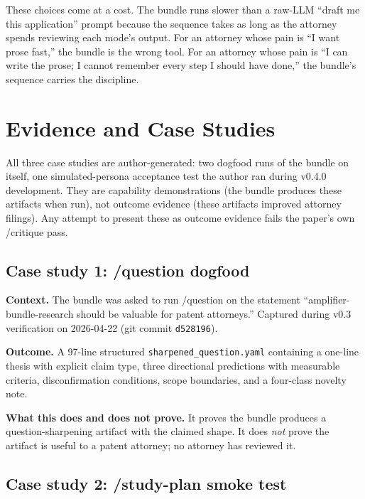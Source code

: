 \documentclass[11pt,letterpaper]{article}
\begin{document}
These choices come at a cost. The bundle runs slower than a raw-LLM
``draft me this application'' prompt because the sequence takes as
long as the attorney spends reviewing each mode's output. For an
attorney whose pain is ``I want prose fast,'' the bundle is the
wrong tool. For an attorney whose pain is ``I can write the prose; I
cannot remember every step I should have done,'' the bundle's
sequence carries the discipline.

\section{Evidence and Case Studies}

All three case studies are author-generated: two dogfood runs of the
bundle on itself, one simulated-persona acceptance test the author
ran during v0.4.0 development. They are capability demonstrations
(the bundle produces these artifacts when run), not outcome evidence
(these artifacts improved attorney filings). Any attempt to present
these as outcome evidence fails the paper's own /critique pass.

\subsection{Case study 1: /question dogfood}

\textbf{Context.} The bundle was asked to run /question on the
statement ``amplifier-bundle-research should be valuable for patent
attorneys.'' Captured during v0.3 verification on 2026-04-22 (git
commit \texttt{d528196}).

\textbf{Outcome.} A 97-line structured \texttt{sharpened\_question.yaml}
containing a one-line thesis with explicit claim type, three
directional predictions with measurable criteria, disconfirmation
conditions, scope boundaries, and a four-class novelty note.

\textbf{What this does and does not prove.} It proves the bundle
produces a question-sharpening artifact with the claimed shape. It
does \emph{not} prove the artifact is useful to a patent attorney;
no attorney has reviewed it.

\subsection{Case study 2: /study-plan smoke test}
\end{document}
